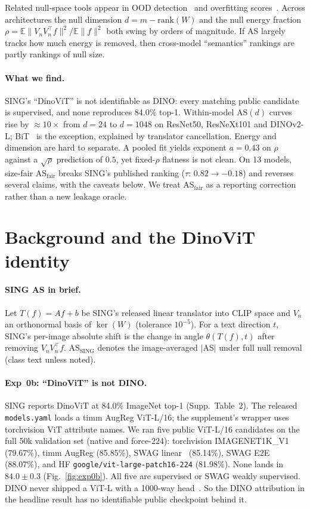 \documentclass[10pt,twocolumn]{article}
\begin{document}
Related null-space tools appear in OOD detection~\citep{vim2022,cook2020} and overfitting scores~\citep{rezaei2023}.
Across architectures the null dimension $d{=}m{-}\mathrm{rank}(W)$ and the null energy fraction
$\rho = \mathbb{E}\|V_nV_n^\top f\|^2/\mathbb{E}\|f\|^2$
both swing by orders of magnitude.
If AS largely tracks how much energy is removed, then cross-model ``semantics'' rankings are partly rankings of null size.

\paragraph{What we find.}
SING's ``DinoViT'' is not identifiable as DINO: every matching public candidate is supervised, and none reproduces 84.0\% top-1.
Within-model AS$(d)$ curves rise by $\approx\!10\times$ from $d{=}24$ to $d{=}1048$ on ResNet50, ResNeXt101 and DINOv2-L; BiT~\citep{bit2020} is the exception, explained by translator cancellation.
Energy and dimension are hard to separate. A pooled fit yields exponent $a{=}0.43$ on $\rho$ against a $\sqrt{\rho}$ prediction of $0.5$, yet fixed-$\rho$ flatness is not clean.
On 13 models, size-fair $\mathrm{AS}_{\mathrm{fair}}$ breaks SING's published ranking ($\tau{:}\,0.82\to{-}0.18$) and reverses several claims, with the caveats below.
We treat $\mathrm{AS}_{\mathrm{fair}}$ as a reporting correction rather than a new leakage oracle.

\section{Background and the DinoViT identity}
\vspace{-0.2em}
\paragraph{SING AS in brief.}
Let $T(f)=Af+b$ be SING's released linear translator into CLIP space and $V_n$ an orthonormal basis of $\ker(W)$ (tolerance $10^{-5}$).
For a text direction $t$, SING's per-image absolute shift is the change in angle $\theta(T(f),t)$ after removing $V_nV_n^\top f$.
$\mathrm{AS}_{\mathrm{SING}}$ denotes the image-averaged $|$AS$|$ under full null removal (class text unless noted).

\paragraph{Exp~0b: ``DinoViT'' is not DINO.}
SING reports DinoViT at 84.0\% ImageNet top-1 (Supp.\ Table~2).
The released \texttt{models.yaml} loads a timm AugReg ViT-L/16; the supplement's wrapper uses torchvision ViT attribute names.
We ran five public ViT-L/16 candidates on the full 50k validation set (native and force-224):
torchvision IMAGENET1K\_V1 (79.67\%),
timm AugReg (85.85\%),
SWAG linear~\citep{swag2022} (85.14\%),
SWAG E2E (88.07\%),
and HF \texttt{google/vit-large-patch16-224} (81.98\%).
None lands in $84.0\pm0.3$ (Fig.~\ref{fig:exp0b}).
All five are supervised or SWAG weakly supervised. DINO never shipped a ViT-L with a 1000-way head~\citep{dino2021}.
So the DINO attribution in the headline result has no identifiable public checkpoint behind it.
\end{document}

